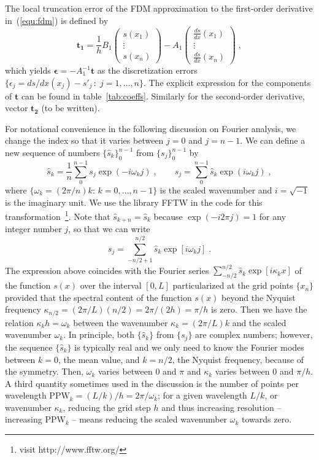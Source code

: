 The local truncation error of the FDM approximation to the first-order
derivative in~(\ref{equ:fdm}) is defined by
\begin{equation}
\mathbf{t_1}=
\frac{1}{h}B_1\left(\begin{array}{c}s(x_1)\\\vdots\\s(x_n)\end{array}\right)-
A_1\left(
\begin{array}{c}\frac{ds}{dx}(x_1)\\\vdots\\\frac{ds}{dx}(x_n) 
\end{array}\right)\;,
\label{equ:truncation1}
\end{equation}
which yields $\boldsymbol{\epsilon} = -A_1^{-1}\mathbf{t}$ as the discretization
errors $\{\epsilon_j=ds/dx(x_j)-s'_j\,:\;j=1,\ldots,n\}$. The explicit
expression for the components of $\mathbf{t}$ can be found in
table~\ref{tab:coeffs}. Similarly for the second-order derivative, vector
$\mathbf{t_2}$ (to be written).

For notational convenience in the following discussion on Fourier analysis, we
change the index so that it varies between $j=0$ and $j=n-1$. We can define a
new sequence of numbers $\{\hat{s}_k\}_0^{n-1}$ from $\{s_j\}_0^{n-1}$ by
\begin{equation}
\hat{s}_k=\frac{1}{n}\sum_0^{n-1}s_j\exp(-i\omega_kj)\;,\qquad
s_j=\sum_0^{n-1}\hat{s}_k\exp(i\omega_kj)\;,
\label{equ:dft}
\end{equation}
where $\{\omega_k=(2\pi/n)k:\, k = 0,\ldots,n-1\}$ is the scaled wavenumber and
$i=\sqrt{-1}$ is the imaginary unit. We use the library FFTW in the code for
this transformation~\footnote{visit {http://www.fftw.org/}}. Note that
$\hat{s}_{k+n}=\hat{s}_k$ because $\exp(-i2\pi j)=1$ for any integer number $j$,
so that we can write
\begin{equation}
  s_j =  \sum_{-n/2+1}^{n/2} \hat{s}_k \exp[i\omega_kj]\;.  
\end{equation}
The expression above coincides with the Fourier series $\sum_{-n/2}^{n/2}
\hat{s}_k \exp[i\kappa_kx]$ of the function $s(x)$ over the interval $[0,L]$
particularized at the grid points $\{x_n\}$ provided that the spectral content
of the function $s(x)$ beyond the Nyquist frequency
$\kappa_{n/2}=(2\pi/L)(n/2)=2\pi/(2h)=\pi/h$ is zero. Then we have the relation
$\kappa_kh=\omega_k$ between the wavenumber $\kappa_k=(2\pi/L)k$ and the scaled
wavenumber $\omega_k$. In principle, both $\{\hat{s}_k\}$ from $\{s_j\}$ are
complex numbers; however, the sequence $\{\hat{s}_k\}$ is typically real and we
only need to know the Fourier modes between $k=0$, the mean value, and $k=n/2$,
the Nyquist frequency, because of the symmetry. Then, $\omega_k$ varies between
0 and $\pi$ and $\kappa_k$ varies between 0 and $\pi/h$. A third quantity
sometimes used in the discussion is the number of points per wavelength
$\mathrm{PPW}_k=(L/k)/h=2\pi/\omega_k$; for a given wavelength $L/k$, or
wavenumber $\kappa_k$, reducing the grid step $h$ and thus increasing resolution
-- increasing $\mathrm{PPW}_k$ -- means reducing the scaled wavenumber
$\omega_k$ towards zero.

